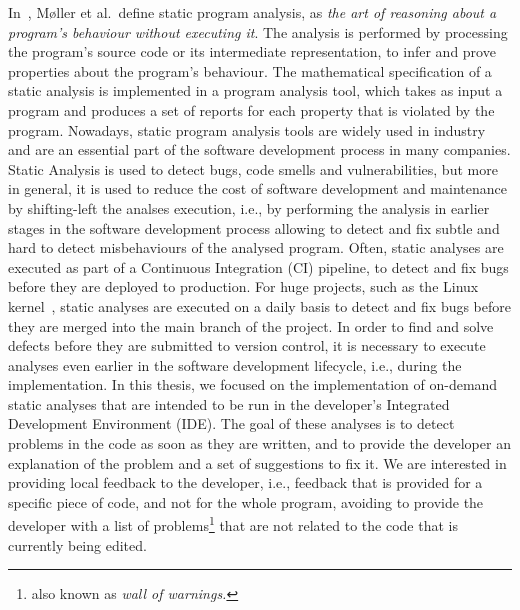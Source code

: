 In~\cite{spa}, M\o{}ller et al.~define static program analysis,
as \emph{the art of reasoning about a program's behaviour without executing it}. 
The analysis is performed by processing the program's source code or its 
intermediate representation, to infer and prove properties about the program's behaviour.
The mathematical specification of a static analysis is implemented in a program analysis tool, which
takes as input a program and produces a set of reports for each property that is violated by the program.
Nowadays, static program analysis tools are widely used in industry~\cite{piskachev2022far} and are an
essential part of the software development process in many companies. Static Analysis
is used to detect bugs, code smells and vulnerabilities, but more in general, it is used to
reduce the cost of software development and maintenance by shifting-left the analses execution, i.e., by
performing the analysis in earlier stages in the software development process allowing
to detect and fix subtle and hard to detect misbehaviours of the analysed program.
Often, static analyses are executed as part of a Continuous Integration (CI) pipeline, to
detect and fix bugs before they are deployed to production. For huge projects, such as
the Linux kernel~\cite{rusling1999linux}, static analyses are executed on a daily basis to detect
and fix bugs before they are merged into the main branch of the project.
In order to find and solve defects before they are submitted to version control,
it is necessary to execute analyses even earlier in the software development lifecycle, i.e., during the implementation.
In this thesis, we focused on the implementation of on-demand static analyses that are 
intended to be run in the developer's Integrated Development Environment (IDE).
The goal of these analyses is to detect problems in the code as soon as they are written,
and to provide the developer an explanation of the problem and a set of suggestions to fix it.
We are interested in providing local feedback to the developer, i.e., feedback that is
provided for a specific piece of code, and not for the whole program, avoiding to 
provide the developer with a list of problems\footnote{also known as \emph{wall of warnings.}} 
that are not related to the code that is currently being edited.





